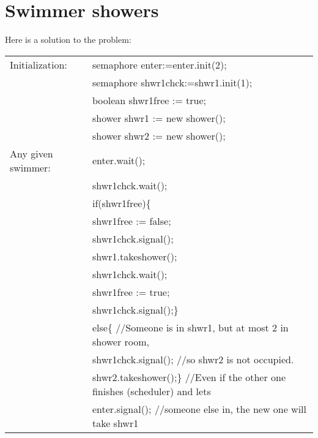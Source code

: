 \documentclass[10pt,a4paper]{article}
\begin{document}
\section{Swimmer showers}

Here is a solution to the problem:\\

\begin{tabular}{|ll|}\hline
Initialization:     &semaphore enter:=enter.init(2);\\
                    &semaphore shwr1chck:=shwr1.init(1);\\
                    &boolean shwr1free := true;\\
                    &shower shwr1 := new shower();\\
                    &shower shwr2 := new shower();\\ \hline
Any given swimmer:  &enter.wait();\\
                    &shwr1chck.wait();\\
                    &if(shwr1free)\{\\
                    &\quad shwr1free := false;  \\
                    &\quad shwr1chck.signal();\\
                    &\quad shwr1.takeshower();\\
                    &\quad shwr1chck.wait();\\
                    &\quad shwr1free := true;\\
                    &\quad shwr1chck.signal();\}\\
                    &else\{ {\color{blue} //Someone is in shwr1, but at most 2 in shower room,}\\
                    &\quad shwr1chck.signal(); {\color{blue} //so shwr2 is not occupied.}\\
                    &\quad shwr2.takeshower();\} {\color{blue} //Even if the other one finishes (scheduler) and lets}\\
                    &enter.signal(); {\color{blue} //someone else in, the new one will take shwr1}\\ \hline
\end{tabular}
\end{document}
